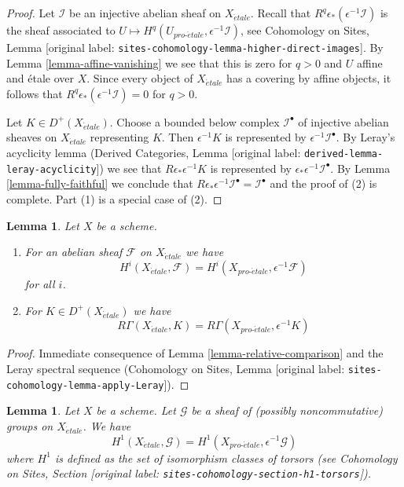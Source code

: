 \documentclass[10pt,a4paper]{article}
\theoremstyle{plain}
\newtheorem{lemma}[subsection]{Lemma}
\theoremstyle{definition}
\theoremstyle{remark}
\numberwithin{equation}{subsection}
\def\proetale{{pro\text{-}\acute{e}tale}}
\def\etale{{\acute{e}tale}}
\begin{document}
\begin{proof}
Let $\mathcal{I}$ be an injective abelian sheaf on $X_\etale$.
Recall that $R^q\epsilon_*(\epsilon^{-1}\mathcal{I})$ is the sheaf associated
to $U \mapsto H^q(U_\proetale, \epsilon^{-1}\mathcal{I})$, see
Cohomology on Sites, Lemma [original label: \nolinkurl{sites-cohomology-lemma-higher-direct-images}].
By Lemma \ref{lemma-affine-vanishing} we see that this is zero for $q > 0$
and $U$ affine and \'etale over $X$. Since every object of
$X_\etale$ has a covering by affine objects, it follows that
$R^q\epsilon_*(\epsilon^{-1}\mathcal{I}) = 0$ for $q > 0$.

\medskip\noindent
Let $K \in D^+(X_\etale)$. Choose a bounded below complex $\mathcal{I}^\bullet$
of injective abelian sheaves on $X_\etale$ representing $K$.
Then $\epsilon^{-1}K$ is represented by $\epsilon^{-1}\mathcal{I}^\bullet$.
By Leray's acyclicity lemma (Derived Categories, Lemma
[original label: \nolinkurl{derived-lemma-leray-acyclicity}]) we see that $R\epsilon_*\epsilon^{-1}K$
is represented by $\epsilon_*\epsilon^{-1}\mathcal{I}^\bullet$.
By Lemma \ref{lemma-fully-faithful} we conclude that
$R\epsilon_*\epsilon^{-1}\mathcal{I}^\bullet = \mathcal{I}^\bullet$
and the proof of (2) is complete. Part (1) is a special case of (2).
\end{proof}

\begin{lemma}
\label{lemma-compare-cohomology}
Let $X$ be a scheme.
\begin{enumerate}
\item For an abelian sheaf $\mathcal{F}$ on $X_\etale$ we have
$$
H^i(X_\etale, \mathcal{F}) =
H^i(X_\proetale, \epsilon^{-1}\mathcal{F})
$$
for all $i$.
\item For $K \in D^+(X_\etale)$ we have
$$
R\Gamma(X_\etale, K) = R\Gamma(X_\proetale, \epsilon^{-1}K)
$$
\end{enumerate}
\end{lemma}

\begin{proof}
Immediate consequence of Lemma \ref{lemma-relative-comparison} and
the Leray spectral sequence (Cohomology on Sites, Lemma
[original label: \nolinkurl{sites-cohomology-lemma-apply-Leray}]).
\end{proof}

\begin{lemma}
\label{lemma-compare-cohomology-nonabelian}
Let $X$ be a scheme. Let $\mathcal{G}$ be a sheaf of (possibly
noncommutative) groups on $X_\etale$. We have
$$
H^1(X_\etale, \mathcal{G}) =
H^1(X_\proetale, \epsilon^{-1}\mathcal{G})
$$
where $H^1$ is defined as the set of isomorphism classes of
torsors (see
Cohomology on Sites, Section [original label: \nolinkurl{sites-cohomology-section-h1-torsors}]).
\end{lemma}
\end{document}
